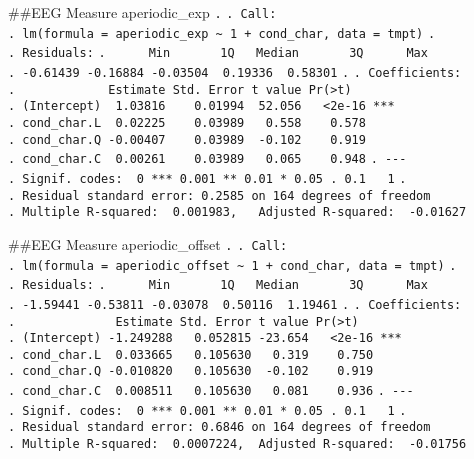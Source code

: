 \documentclass[
]{article}
\begin{document}
\#\#EEG Measure aperiodic\_exp \texttt{.} \texttt{.\ Call:}
\texttt{.\ lm(formula\ =\ aperiodic\_exp\ \textasciitilde{}\ 1\ +\ cond\_char,\ data\ =\ tmpt)}
\texttt{.} \texttt{.\ Residuals:}
\texttt{.\ \ \ \ \ \ Min\ \ \ \ \ \ \ 1Q\ \ \ Median\ \ \ \ \ \ \ 3Q\ \ \ \ \ \ Max}
\texttt{.\ -0.61439\ -0.16884\ -0.03504\ \ 0.19336\ \ 0.58301}
\texttt{.} \texttt{.\ Coefficients:}
\texttt{.\ \ \ \ \ \ \ \ \ \ \ \ \ Estimate\ Std.\ Error\ t\ value\ Pr(\textgreater{}\textbar{}t\textbar{})}
\texttt{.\ (Intercept)\ \ 1.03816\ \ \ \ 0.01994\ \ 52.056\ \ \ \textless{}2e-16\ ***}
\texttt{.\ cond\_char.L\ \ 0.02225\ \ \ \ 0.03989\ \ \ 0.558\ \ \ \ 0.578}
\texttt{.\ cond\_char.Q\ -0.00407\ \ \ \ 0.03989\ \ -0.102\ \ \ \ 0.919}
\texttt{.\ cond\_char.C\ \ 0.00261\ \ \ \ 0.03989\ \ \ 0.065\ \ \ \ 0.948}
\texttt{.\ -\/-\/-}
\texttt{.\ Signif.\ codes:\ \ 0\ \textquotesingle{}***\textquotesingle{}\ 0.001\ \textquotesingle{}**\textquotesingle{}\ 0.01\ \textquotesingle{}*\textquotesingle{}\ 0.05\ \textquotesingle{}.\textquotesingle{}\ 0.1\ \textquotesingle{}\ \textquotesingle{}\ 1}
\texttt{.}
\texttt{.\ Residual\ standard\ error:\ 0.2585\ on\ 164\ degrees\ of\ freedom}
\texttt{.\ Multiple\ R-squared:\ \ 0.001983,\ \ \ Adjusted\ R-squared:\ \ -0.01627}

\#\#EEG Measure aperiodic\_offset \texttt{.} \texttt{.\ Call:}
\texttt{.\ lm(formula\ =\ aperiodic\_offset\ \textasciitilde{}\ 1\ +\ cond\_char,\ data\ =\ tmpt)}
\texttt{.} \texttt{.\ Residuals:}
\texttt{.\ \ \ \ \ \ Min\ \ \ \ \ \ \ 1Q\ \ \ Median\ \ \ \ \ \ \ 3Q\ \ \ \ \ \ Max}
\texttt{.\ -1.59441\ -0.53811\ -0.03078\ \ 0.50116\ \ 1.19461}
\texttt{.} \texttt{.\ Coefficients:}
\texttt{.\ \ \ \ \ \ \ \ \ \ \ \ \ \ Estimate\ Std.\ Error\ t\ value\ Pr(\textgreater{}\textbar{}t\textbar{})}
\texttt{.\ (Intercept)\ -1.249288\ \ \ 0.052815\ -23.654\ \ \ \textless{}2e-16\ ***}
\texttt{.\ cond\_char.L\ \ 0.033665\ \ \ 0.105630\ \ \ 0.319\ \ \ \ 0.750}
\texttt{.\ cond\_char.Q\ -0.010820\ \ \ 0.105630\ \ -0.102\ \ \ \ 0.919}
\texttt{.\ cond\_char.C\ \ 0.008511\ \ \ 0.105630\ \ \ 0.081\ \ \ \ 0.936}
\texttt{.\ -\/-\/-}
\texttt{.\ Signif.\ codes:\ \ 0\ \textquotesingle{}***\textquotesingle{}\ 0.001\ \textquotesingle{}**\textquotesingle{}\ 0.01\ \textquotesingle{}*\textquotesingle{}\ 0.05\ \textquotesingle{}.\textquotesingle{}\ 0.1\ \textquotesingle{}\ \textquotesingle{}\ 1}
\texttt{.}
\texttt{.\ Residual\ standard\ error:\ 0.6846\ on\ 164\ degrees\ of\ freedom}
\texttt{.\ Multiple\ R-squared:\ \ 0.0007224,\ \ Adjusted\ R-squared:\ \ -0.01756}
\end{document}
